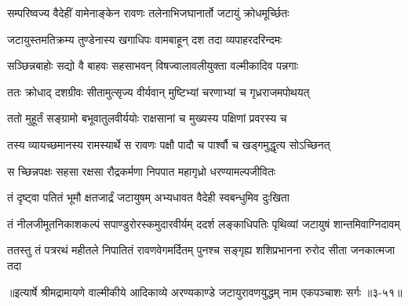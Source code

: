 \twolineshloka
{सम्परिष्वज्य वैदेहीं वामेनाङ्केन रावणः}
{तलेनाभिजघानार्तो जटायुं क्रोधमूर्च्छितः} %

\twolineshloka
{जटायुस्तमतिक्रम्य तुण्डेनास्य खगाधिपः}
{वामबाहून् दश तदा व्यपाहरदरिन्दमः} %

\twolineshloka
{सञ्छिन्नबाहोः सद्यो वै बाहवः सहसाभवन्}
{विषज्वालावलीयुक्ता वल्मीकादिव पन्नगाः} %

\twolineshloka
{ततः क्रोधाद् दशग्रीवः सीतामुत्सृज्य वीर्यवान्}
{मुष्टिभ्यां चरणाभ्यां च गृध्रराजमपोथयत्} %

\twolineshloka
{ततो मुहूर्तं सङ्ग्रामो बभूवातुलवीर्ययोः}
{राक्षसानां च मुख्यस्य पक्षिणां प्रवरस्य च} %

\twolineshloka
{तस्य व्यायच्छमानस्य रामस्यार्थे स रावणः}
{पक्षौ पादौ च पार्श्वौ च खड्गमुद्धृत्य सोऽच्छिनत्} %

\twolineshloka
{स च्छिन्नपक्षः सहसा रक्षसा रौद्रकर्मणा}
{निपपात महागृध्रो धरण्यामल्पजीवितः} %

\twolineshloka
{तं दृष्ट्वा पतितं भूमौ क्षतजार्द्रं जटायुषम्}
{अभ्यधावत वैदेही स्वबन्धुमिव दुःखिता} %

\twolineshloka
{तं नीलजीमूतनिकाशकल्पं सपाण्डुरोरस्कमुदारवीर्यम्}
{ददर्श लङ्काधिपतिः पृथिव्यां जटायुषं शान्तमिवाग्निदावम्} %

\twolineshloka
{ततस्तु तं पत्ररथं महीतले निपातितं रावणवेगमर्दितम्}
{पुनश्च सङ्गृह्य शशिप्रभानना रुरोद सीता जनकात्मजा तदा} %


॥इत्यार्षे श्रीमद्रामायणे वाल्मीकीये आदिकाव्ये अरण्यकाण्डे जटायुरावणयुद्धम् नाम एकपञ्चाशः सर्गः ॥३-५१॥
